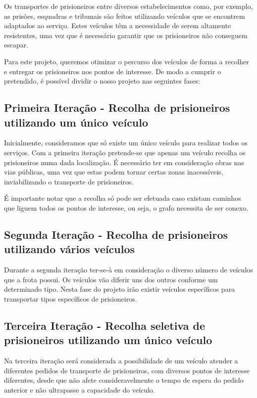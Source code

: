\documentclass[article, a4paper, 12pt, oneside]{memoir}
\begin{document}
Os transportes de prisioneiros entre diversos estabelecimentos como, por exemplo, as prisões, esquadras e tribunais são feitos utilizando veículos que se encontrem adaptados ao serviço. Estes veículos têm a necessidade de serem altamente resistentes, uma vez que é necessário garantir que os prisioneiros não conseguem escapar.

Para este projeto, queremos otimizar o percurso dos veículos de forma a recolher e entregar os prisioneiros nos pontos de interesse. De modo a cumprir o pretendido, é possível dividir o nosso projeto nas seguintes fases:

\subsection{Primeira Iteração - Recolha de prisioneiros utilizando um único veículo}
	Inicialmente, consideramos que só existe um único veículo para realizar todos os serviços.
	Com a primeira iteração pretende-se que apenas um veículo recolha os prisioneiros numa dada localização.
	É necessário ter em consideração obras nas vias públicas, uma vez que estas podem tornar certas zonas inacessíveis, inviabilizando o transporte de prisioneiros.

	É importante notar que a recolha só pode ser efetuada caso existam caminhos que liguem todos os pontos de interesse, ou seja, o grafo necessita de ser conexo.

\subsection{Segunda Iteração - Recolha de prisioneiros utilizando vários veículos}
	Durante a segunda iteração ter-se-à em consideração o diverso número de veículos que a frota possui. Os veículos vão diferir uns dos outros conforme um determinado tipo. Nesta fase do projeto irão existir veículos específicos para transportar tipos específicos de prisioneiros.

\subsection{Terceira Iteração - Recolha seletiva de prisioneiros utilizando um único veículo}
	Na terceira iteração será considerada a possibilidade de um veículo atender a diferentes pedidos de transporte de prisioneiros, com diversos pontos de interesse diferentes, desde que não afete consideravelmente o tempo de espera do pedido anterior e não ultrapasse a capacidade do veículo.
	
\end{document}

